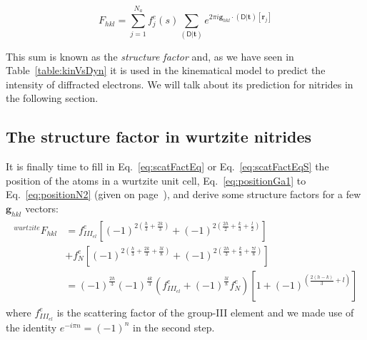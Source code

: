 \begin{equation}
\label{eq:scatFactEq}
F_{hkl} = \sum_{j=1}^{N_a} f^e_j(s) \sum_{(\mathsf{D}|\mathbf{t})} e^{2\pi i  \mathbf{g}_{hkl} \cdot (\mathsf{D}|\mathbf{t})[\mathbf{r}_j] }
\end{equation}



This sum is known as the \textit{structure factor} and, as we have seen in Table~\ref{table:kinVsDyn} it is used in the kinematical model to predict the intensity of diffracted electrons. We will talk about its prediction for nitrides in the following section.

%
\subsection{The structure factor in wurtzite nitrides}
{\label{sec:SF_GAN}}

It is finally time to fill in Eq.~\ref{eq:scatFactEq} or Eq.~\ref{eq:scatFactEqS} the position of the atoms in a wurtzite unit cell, Eq.~\ref{eq:positionGa1} to Eq.~\ref{eq:positionN2} (given on page~\pageref{eq:positionGa1}), and derive some structure factors for a few $\mathbf{g}_{hkl}$ vectors: 
\begin{align}
\begin{split}
\label{eq:scatFactWurzite}
^{wurtzite}F_{hkl} &= f^e_{III_{el}}  \left[(-1)^{2(\frac{h}{3} + \frac{2k}{3})}  + (-1)^{2(\frac{2h}{2} + \frac{k}{3} +\frac{l}{2})} \right] \\
                & + f^e_{N}  \left[(-1)^{2(\frac{h}{3} + \frac{2k}{3} + \frac{3l}{8})}  + (-1)^{2(\frac{2h}{3} + \frac{k}{3} +\frac{7l}{8})} \right] \\
                &= (-1)^\frac{2h}{3} (-1)^\frac{4k}{3}  \left( f^e_{III_{el}} +   (-1)^\frac{3l}{8} f^e_{N} \right) \left[ 1  + (-1)^{ (\frac{2(h-k)}{3}  + l)}  \right]
\end{split}
\end{align}
where $f^e_{III_{el}}$ is the scattering factor of the group-III element and we made use of the identity  $e^{-i \pi n}=(-1)^n$ in the second step.




